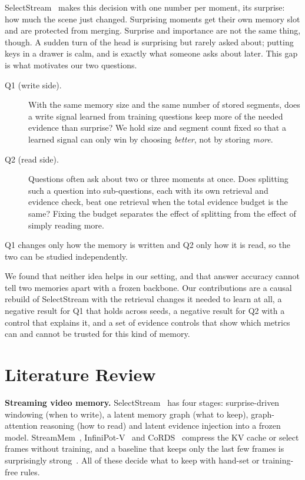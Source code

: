 \documentclass[11pt,a4paper]{article}
\begin{document}
SelectStream~\cite{selectstream} makes this decision with one number per moment, its surprise: how much the
scene just changed. Surprising moments get their own memory slot and are protected from merging. Surprise and
importance are not the same thing, though. A sudden turn of the head is surprising but rarely asked
about; putting keys in a drawer is calm, and is exactly what someone asks about later. This gap is what motivates our two
questions.

\begin{description}
\item[Q1 (write side).] With the same memory size and the same number of stored segments, does a write signal learned
  from training questions keep more of the needed evidence than surprise? We hold size and segment count fixed so that a
  learned signal can only win by choosing \emph{better}, not by storing \emph{more}.
\item[Q2 (read side).] Questions often ask about two or three moments at once. Does splitting such a question into
  sub-questions, each with its own retrieval and evidence check, beat one retrieval when the total evidence budget is the
  same? Fixing the budget separates the effect of splitting from the effect of simply reading more.
\end{description}
Q1 changes only how the memory is written and Q2 only how it is read, so the two can be studied independently.

We found that neither idea helps in our setting, and that answer accuracy cannot tell two memories apart with a frozen
backbone. Our contributions are a causal rebuild of SelectStream with the retrieval changes it needed to learn at all, a
negative result for Q1 that holds across seeds, a negative result for Q2 with a control that explains it, and a set of
evidence controls that show which metrics can and cannot be trusted for this kind of memory.

\section{Literature Review}\label{sec:lit}

\textbf{Streaming video memory.} SelectStream~\cite{selectstream} has four stages: surprise-driven windowing (when to write),
a latent memory graph (what to keep), graph-attention reasoning (how to read) and latent evidence injection into a frozen
model. StreamMem~\cite{streammem}, InfiniPot-V~\cite{infinipot} and CoRDS~\cite{cords} compress the KV cache or select
frames without training, and a baseline that keeps only the last few frames is surprisingly strong~\cite{simplebaseline}.
All of these decide what to keep with hand-set or training-free rules.
\end{document}
